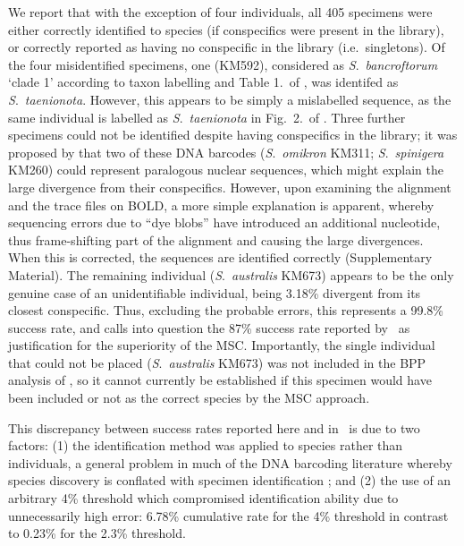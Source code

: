 \documentclass[12pt]{article}
\begin{document}
We report that with the exception of four individuals, all 405 specimens were either correctly identified to species (if conspecifics were present in the library), or correctly reported as having no conspecific in the library (i.e.\ singletons).  Of the four misidentified specimens, one (KM592), considered as \emph{S}.\ \emph{bancroftorum} `clade 1' according to taxon labelling and Table 1.\ of \citeauthor{Dowton2014},  was identifed as \emph{S}.\ \emph{taenionota}. However, this appears to be simply a mislabelled sequence, as the same individual is labelled as  \emph{S}.\ \emph{taenionota} in Fig.\ 2.\ of \citet{Meiklejohn2013}. Three further specimens could not be identified despite having conspecifics in the library; it was proposed by \citet{Meiklejohn2012} that two of these DNA barcodes (\emph{S}.\ \emph{omikron} KM311; \emph{S}.\ \emph{spinigera} KM260) could represent paralogous nuclear sequences, which might explain the large divergence from their conspecifics. However, upon examining the alignment and the trace files on BOLD, a more simple explanation is apparent, whereby sequencing errors due to ``dye blobs'' have introduced an additional nucleotide, thus frame-shifting part of the alignment and causing the large divergences. When this is corrected, the sequences are identified correctly (Supplementary Material).  The remaining individual (\emph{S}.\ \emph{australis} KM673) appears to be the only genuine case of an unidentifiable individual, being 3.18\% divergent from its closest conspecific. Thus, excluding the probable errors, this represents a 99.8\% success rate, and calls into question the 87\% success rate reported by \citeauthor{Dowton2014}\ as justification for the superiority of the MSC. Importantly, the single individual that could not be placed (\emph{S}.\ \emph{australis} KM673) was not included in the BPP analysis of \citeauthor{Dowton2014}, so it cannot currently be established if this specimen would have been included or not as the correct species by the MSC approach. 

This discrepancy between success rates reported here and in \citeauthor{Dowton2014}\ is due to two factors: (1) the identification method was applied to species rather than individuals, a general problem in much of the DNA barcoding literature whereby species discovery is conflated with specimen identification \citep{Collins2013}; and (2) the use of an arbitrary 4\% threshold which compromised identification ability due to unnecessarily high error: 6.78\% cumulative rate for the 4\% threshold in contrast to 0.23\% for the 2.3\% threshold. 
\end{document}
